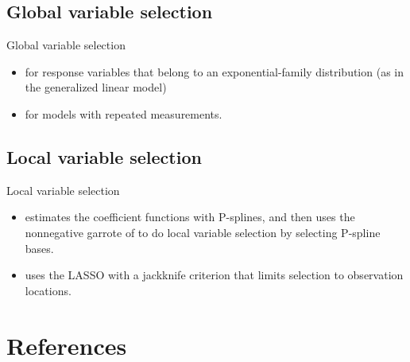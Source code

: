 \documentclass{beamer}
\begin{document}
    \subsection{Global variable selection}
    \begin{frame}{Global variable selection}
        \begin{itemize}
            \item  \cite{Fan:1999} for response variables that belong to an exponential-family distribution (as in the generalized linear model)
            \item \cite{Wang:2008a} for models with repeated measurements.
        \end{itemize}
    \end{frame}


    \subsection{Local variable selection}
    \begin{frame}{Local variable selection}
        \begin{itemize}
            \item \cite{Antoniadis:2012a} estimates the coefficient functions with P-splines, and then uses the nonnegative garrote of \cite{Breiman:1995} to do local variable selection by selecting P-spline bases.
            \item \cite{Wheeler:2009} uses the LASSO with a jackknife criterion that limits selection to observation locations.
        \end{itemize}
    \end{frame}

\section{References}


\end{document}
